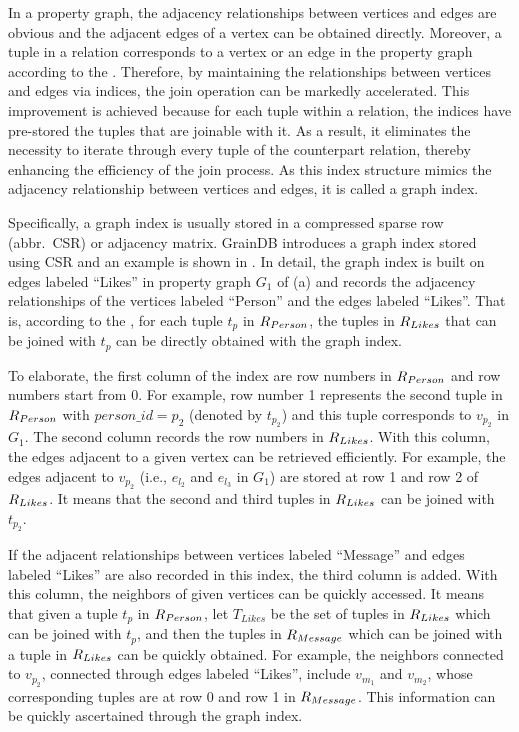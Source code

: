 In a property graph, the adjacency relationships between vertices and edges are obvious and the adjacent edges of a vertex can be obtained directly.
Moreover, a tuple in a relation corresponds to a vertex or an edge in the property graph according to the \rgmapping.
Therefore, by maintaining the relationships between vertices and edges via indices, the join operation can be markedly accelerated. 
This improvement is achieved because for each tuple within a relation, the indices have pre-stored the tuples that are joinable with it. 
As a result, it eliminates the necessity to iterate through every tuple of the counterpart relation, thereby enhancing the efficiency of the join process.
As this index structure mimics the adjacency relationship between vertices and edges, it is called a graph index.


Specifically, a graph index is usually stored in a compressed sparse row (abbr.~CSR) \cite{} or adjacency matrix.
GrainDB \cite{graindb} introduces a graph index stored using CSR and an example is shown in .
In detail, the graph index is built on edges labeled ``Likes'' in property graph $G_1$ of (a) and records the adjacency relationships of the vertices labeled ``Person'' and the edges labeled ``Likes''.
That is, according to the \rgmapping, for each tuple $t_p$ in ${R_{Person}}$, the tuples in ${R_{Likes}}$ that can be joined with $t_p$ can be directly obtained with the graph index.

To elaborate, the first column of the index are row numbers in ${R_{Person}}$ and row numbers start from 0.
For example, row number 1 represents the second tuple in ${R_{Person}}$ with $person\_id = p_2$ (denoted by $t_{p_2}$) and this tuple corresponds to $v_{p_2}$ in $G_1$.
The second column records the row numbers in ${R_{Likes}}$.
With this column, the edges adjacent to a given vertex can be retrieved efficiently.
For example, the edges adjacent to $v_{p_2}$ (i.e., $e_{l_2}$ and $e_{l_3}$ in $G_1$) are stored at row 1 and row 2 of ${R_{Likes}}$.
It means that the second and third tuples in ${R_{Likes}}$ can be joined with $t_{p_2}$.

If the adjacent relationships between vertices labeled ``Message'' and edges labeled ``Likes'' are also recorded in this index, the third column is added.
With this column, the neighbors of given vertices can be quickly accessed.
It means that given a tuple $t_p$ in ${R_{Person}}$, let $T_{Likes}$ be the set of tuples in ${R_{Likes}}$ which can be joined with $t_p$, and then the tuples in ${R_{Message}}$ which can be joined with a tuple in ${R_{Likes}}$ can be quickly obtained.
For example, the neighbors connected to $v_{p_2}$, connected through edges labeled ``Likes'', include $v_{m_1}$ and $v_{m_2}$, whose corresponding tuples are at row 0 and row 1 in ${R_{Message}}$.
This information can be quickly ascertained through the graph index.


